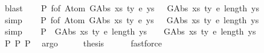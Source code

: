 \begin{isabellebody}
\ blast\isanewline
\ \ \isamarkupfalse%
\ P{}{\isacharcolon}{\kern0pt}\ {\isachardoublequoteopen}f{\isacharunderscore}{\kern0pt}of\ {\isacharparenleft}{\kern0pt}Atom\ {\isacharparenleft}{\kern0pt}GAbs\ xs{}\ ty{}\ e{}{\isacharparenright}{\kern0pt}\ ys{}{\isacharparenright}{\kern0pt}\ {\isacharequal}{\kern0pt}\ {\isacharbraceleft}{\kern0pt}{\isacharhash}{\kern0pt}\ {\isacharparenleft}{\kern0pt}GAbs\ xs{}\ ty{}\ e{}{\isacharcomma}{\kern0pt}\ length\ ys{}{\isacharparenright}{\kern0pt}\ {\isacharhash}{\kern0pt}{\isacharbraceright}{\kern0pt}{\isachardoublequoteclose}\isanewline
\ \ \ \ \isamarkupfalse%
\ simp\isanewline
\ \ \isamarkupfalse%
\ P{}{\isacharcolon}{\kern0pt}\ {\isachardoublequoteopen}f{\isacharunderscore}{\kern0pt}of\ {\isacharparenleft}{\kern0pt}Atom\ {\isacharparenleft}{\kern0pt}GAbs\ xs{}\ ty{}\ e{}{\isacharparenright}{\kern0pt}\ ys{}{\isacharparenright}{\kern0pt}\ {\isacharequal}{\kern0pt}\ {\isacharbraceleft}{\kern0pt}{\isacharhash}{\kern0pt}\ {\isacharparenleft}{\kern0pt}GAbs\ xs{}\ ty{}\ e{}{\isacharcomma}{\kern0pt}\ length\ ys{}{\isacharparenright}{\kern0pt}\ {\isacharhash}{\kern0pt}{\isacharbraceright}{\kern0pt}{\isachardoublequoteclose}\isanewline
\ \ \ \ \isamarkupfalse%
\ simp\isanewline
\ \ \isamarkupfalse%
\ P{}{\isacharcolon}{\kern0pt}\ {\isachardoublequoteopen}{\isacharbraceleft}{\kern0pt}{\isacharhash}{\kern0pt}\ {\isacharparenleft}{\kern0pt}GAbs\ xs{}\ ty{}\ e{}{\isacharcomma}{\kern0pt}\ length\ ys{}{\isacharparenright}{\kern0pt}\ {\isacharhash}{\kern0pt}{\isacharbraceright}{\kern0pt}\ {\isacharequal}{\kern0pt}\ {\isacharbraceleft}{\kern0pt}{\isacharhash}{\kern0pt}\ {\isacharparenleft}{\kern0pt}GAbs\ xs{}\ ty{}\ e{}{\isacharcomma}{\kern0pt}\ length\ ys{}{\isacharparenright}{\kern0pt}\ {\isacharhash}{\kern0pt}{\isacharbraceright}{\kern0pt}{\isachardoublequoteclose}\isanewline
\ \ \ \ \isamarkupfalse%
\ P{}\ P{}\ P{}\ \isamarkupfalse%
\ argo\isanewline
\ \ \isamarkupfalse%
\ \isamarkupfalse%
\ {\isacharquery}{\kern0pt}thesis\isanewline
\ \ \ \ \isamarkupfalse%
\ fastforce\isanewline
{}\isamarkupfalse%

\end{isabellebody}
